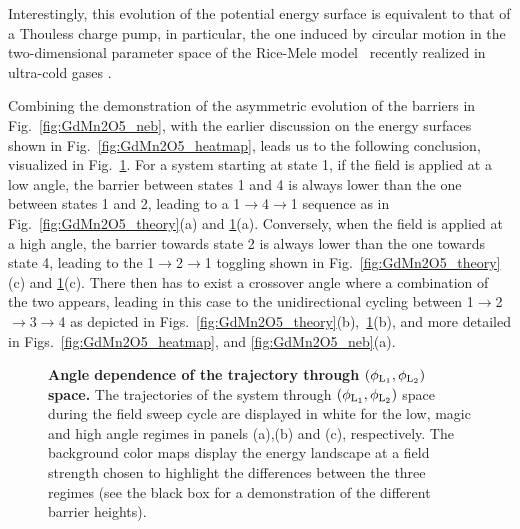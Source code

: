 Interestingly, this evolution of the potential energy surface is equivalent to that of a Thouless charge pump, in particular, the one induced by circular motion in the two-dimensional parameter space of the Rice-Mele model~\cite{Rice82} recently realized in ultra-cold gases \cite{Lohse16,Nakajima16,Atala13}.

Combining the demonstration of the asymmetric evolution of the barriers in Fig.~\ref{fig:GdMn2O5_neb}, with the earlier discussion on the energy surfaces shown in Fig.~\ref{fig:GdMn2O5_heatmap}, leads us to the following conclusion, visualized in Fig.~\ref{fig:GdMn2O5_trajectories}.
For a system starting at state 1, if the field is applied at a low angle, the barrier between states 1 and 4 is always lower than the one between states 1 and 2, leading to a 1$\rightarrow$4$\rightarrow$1 sequence as in Fig.~\ref{fig:GdMn2O5_theory}(a) and \ref{fig:GdMn2O5_trajectories}(a).
Conversely, when the field is applied at a high angle, the barrier towards state 2 is always lower than the one towards state 4, leading to the 1$\rightarrow$2$\rightarrow$1 toggling shown in Fig.~\ref{fig:GdMn2O5_theory}(c) and \ref{fig:GdMn2O5_trajectories}(c).
There then has to exist a crossover angle where a combination of the two appears, leading in this case to the unidirectional cycling between 1$\rightarrow$2$\rightarrow$3$\rightarrow$4 as depicted in Figs.~\ref{fig:GdMn2O5_theory}(b),~\ref{fig:GdMn2O5_trajectories}(b), and more detailed in Figs.~\ref{fig:GdMn2O5_heatmap}, and \ref{fig:GdMn2O5_neb}(a).
\begin{figure}
    \caption{\label{fig:GdMn2O5_trajectories}{\bf Angle dependence of the trajectory through $(\phi_{\rm L_1},\phi_{\rm L_2})$ space.}
    The trajectories of the system through $(\phi_{\rm L_1},\phi_{\rm L_2})$ space during the field sweep cycle are displayed in white for the low, magic and high angle regimes in panels (a),(b) and (c), respectively. The background color maps display the energy landscape at a field strength chosen to highlight the differences between the three regimes (see the black box for a demonstration of the different barrier heights). 
}
\end{figure}

